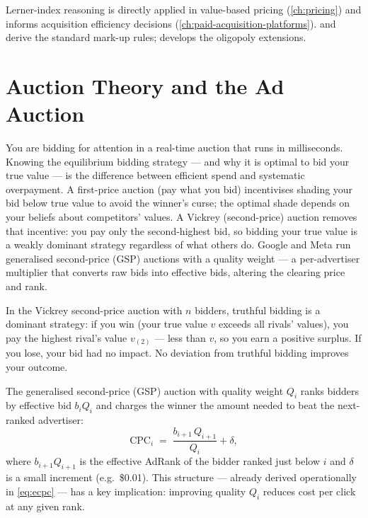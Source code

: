 Lerner-index reasoning is directly applied in value-based pricing (\cref{ch:pricing}) and informs
acquisition efficiency decisions (\cref{ch:paid-acquisition-platforms}). \textcite{pindyck2017}
and \textcite{mankiw2020} derive the standard mark-up rules; \textcite{dranove7theconomics}
develops the oligopoly extensions.

\section{Auction Theory and the Ad Auction}\label{sec:auction-theory}

You are bidding for attention in a real-time auction that runs in milliseconds. Knowing the
equilibrium bidding strategy --- and why it is optimal to bid your true value --- is the
difference between efficient spend and systematic overpayment. A first-price auction (pay what
you bid) incentivises shading your bid below true value to avoid the winner's curse; the optimal
shade depends on your beliefs about competitors' values. A Vickrey (second-price) auction
removes that incentive: you pay only the second-highest bid, so bidding your true value is a
weakly dominant strategy regardless of what others do. Google and Meta run generalised
second-price (GSP) auctions with a quality weight --- a per-advertiser multiplier that converts
raw bids into effective bids, altering the clearing price and rank.

In the Vickrey second-price auction with \(n\) bidders, truthful bidding is a dominant strategy:
if you win (your true value \(v\) exceeds all rivals' values), you pay the highest rival's value
\(v_{(2)}\) --- less than \(v\), so you earn a positive surplus. If you lose, your bid had no
impact. No deviation from truthful bidding improves your outcome.

The generalised second-price (GSP) auction with quality weight \(Q_i\) ranks bidders by effective
bid \(b_i Q_i\) and charges the winner the amount needed to beat the next-ranked advertiser:
\begin{equation}\label{eq:gsp}
  \mathrm{CPC}_i \;=\; \frac{b_{i+1}\,Q_{i+1}}{Q_i} + \delta,
\end{equation}
where \(b_{i+1}Q_{i+1}\) is the effective AdRank of the bidder ranked just below \(i\) and
\(\delta\) is a small increment (e.g.\ \$0.01). This structure --- already derived operationally
in \cref{eq:ecpc} --- has a key implication: improving quality \(Q_i\) reduces cost per click at
any given rank.

